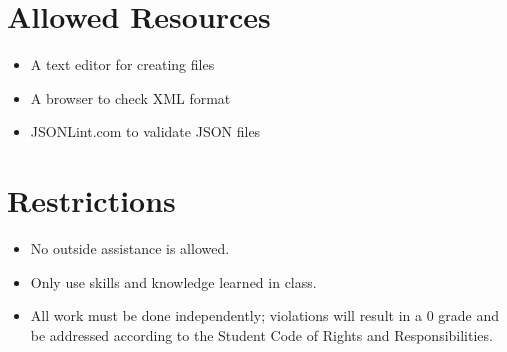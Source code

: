 \documentclass{article}
\begin{document}
\section*{Allowed Resources}
\begin{itemize}
    \item A text editor for creating files
    \item A browser to check XML format
    \item JSONLint.com to validate JSON files
\end{itemize}

\section*{Restrictions}
\begin{itemize}
    \item No outside assistance is allowed.
    \item Only use skills and knowledge learned in class.
    \item All work must be done independently; violations will result in a 0 grade and be addressed according to the Student Code of Rights and Responsibilities.
\end{itemize}
\end{document}
